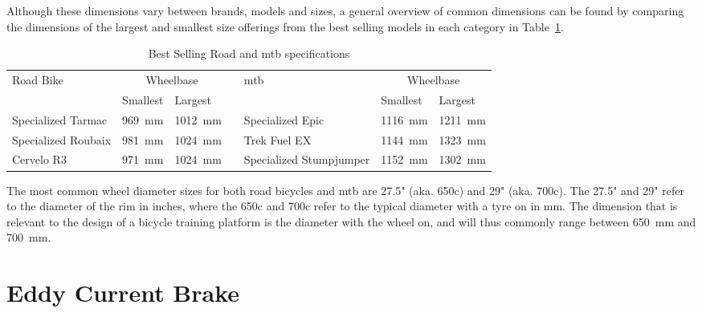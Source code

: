 \vspace*{-1cm}

Although these dimensions vary between brands, models and sizes, a general overview of common dimensions can be found by comparing the dimensions of the largest and smallest size offerings from the best selling models in each category in Table~\ref{tab:bikes}. \citep{Lin:2021}

\begin{table}[H]
	\renewcommand{\arraystretch}{\tablestretch}
	\centering
	\caption{Best Selling Road and \ac{mtb} specifications}
	\citep[2022]{Geometry:2022}
	\begin{tabularx}{\textwidth}{p{2.6cm} X Xp{0.05cm} p{2.6cm} X X}
		\toprule
		Road Bike           & \multicolumn{2}{c}{Wheelbase} &                         & \ac{mtb} & \multicolumn{2}{c}{Wheelbase}                                                     \\
		                    & Smallest                      & Largest                 &          &                               & Smallest                & Largest                 \\
		\midrule
		Specialized Tarmac  & \SI{969}{\milli\meter}        & \SI{1012}{\milli\meter} &          & Specialized Epic              & \SI{1116}{\milli\meter} & \SI{1211}{\milli\meter} \\
		Specialized Roubaix & \SI{981}{\milli\meter}        & \SI{1024}{\milli\meter} &          & Trek Fuel EX                  & \SI{1144}{\milli\meter} & \SI{1323}{\milli\meter} \\
		Cervelo R3          & \SI{971}{\milli\meter}        & \SI{1024}{\milli\meter} &          & Specialized Stumpjumper       & \SI{1152}{\milli\meter} & \SI{1302}{\milli\meter} \\
		\bottomrule
	\end{tabularx}
	\label{tab:bikes}
\end{table}

The most common wheel diameter sizes for both road bicycles and \ac{mtb} are 27.5" (aka. 650c) and 29" (aka. 700c). The 27.5" and 29" refer to the diameter of the rim in inches, where the 650c and 700c refer to the typical diameter with a tyre on in \si{\milli\meter}. The dimension that is relevant to the design of a bicycle training platform is the diameter with the wheel on, and will thus commonly range between \SI{650}{\milli\meter} and \SI{700}{\milli\meter}. \citep{Montague:2019}

\section{Eddy Current Brake}

